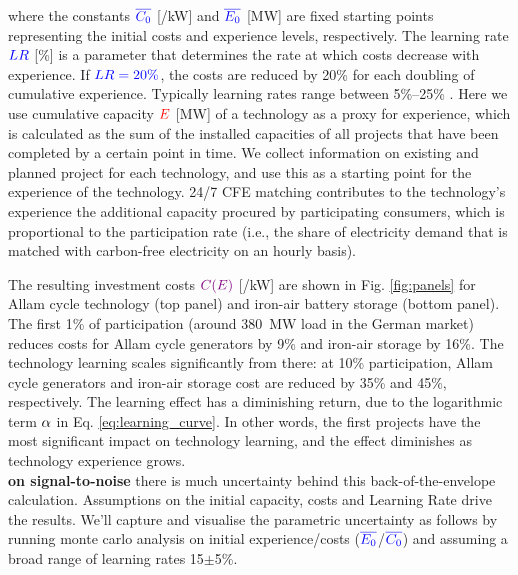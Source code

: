 \documentclass[pdflatex,sn-basic, Numbered]{sn-jnl}%
\theoremstyle{thmstyleone}%
\theoremstyle{thmstyletwo}%
\theoremstyle{thmstylethree}%
\begin{document}
\noindent where the constants $\color{blue}\overline{C_0}$ [\officialeuro/kW] and $\color{blue}\overline{E_0}$ [MW] are fixed starting points representing the initial costs and experience levels, respectively. The learning rate $\color{blue}LR$ [\%] is a parameter that determines the rate at which costs decrease with experience. If $\color{blue}LR=20\%$, the costs are reduced by 20\% for each doubling of cumulative experience. Typically learning rates range between 5\%--25\% \cite{waySuppplementaryMaterialsEmpirically2022}. Here we use cumulative capacity $\color{red}E$ [MW] of a technology as a proxy for experience, which is calculated as the sum of the installed capacities of all projects that have been completed by a certain point in time. We collect information on existing and planned project for each technology, and use this as a starting point for the experience of the technology. 24/7 CFE matching contributes to the technology's experience the additional capacity procured by participating consumers, which is proportional to the participation rate (i.e., the share of electricity demand that is matched with carbon-free electricity on an hourly basis).

The resulting investment costs $\color{violet}C(E)\color{black}$ [\officialeuro/kW] are shown in Fig. \ref{fig:panels} for Allam cycle technology (top panel) and iron-air battery storage (bottom panel).
The first 1\% of participation (around 380~MW load in the German market) reduces costs for Allam cycle generators by 9\% and iron-air storage by 16\%. The technology learning scales significantly from there: at 10\% participation, Allam cycle generators and iron-air storage cost are reduced by 35\% and 45\%, respectively. The learning effect has a diminishing return, due to the logarithmic term $\color{black}\alpha$ in Eq. \ref{eq:learning_curve}. In other words, the first projects have the most significant impact on technology learning, and the effect diminishes as technology experience grows. \\


\noindent\textbf{on signal-to-noise} there is much uncertainty behind this back-of-the-envelope calculation. Assumptions on the initial capacity, costs and Learning Rate drive the results. We'll capture and visualise the parametric uncertainty as follows by running monte carlo analysis on initial experience/costs ($\color{blue}\overline{E_0}\color{black}$/$\color{blue}\overline{C_0}\color{black}$) and assuming a broad range of learning rates 15$\pm$5\%. \\
\end{document}
